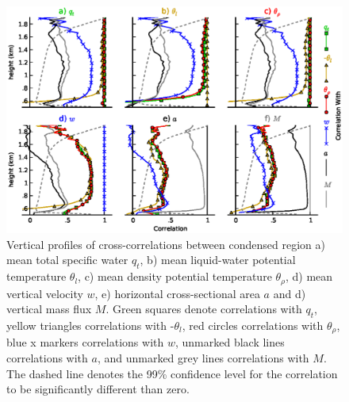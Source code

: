 \documentclass[acp]{copernicus}
\begin{document}
\begin{figure}[t]
\vspace*{2mm}
\begin{center}
\includegraphics[width=\textwidth]{./figures/cloud_autocorrelation}
\end{center}
\caption{Vertical profiles of cross-correlations between condensed region 
a) mean total specific water $q_t$, b) mean liquid-water potential 
temperature $\theta_l$, c) mean density potential temperature $\theta_\rho$, 
d) mean vertical velocity $w$, e) horizontal cross-sectional area $a$ and 
d) vertical mass flux $M$.  Green squares denote correlations with $q_t$, 
yellow triangles correlations with -$\theta_l$, red circles correlations with 
$\theta_\rho$, blue x markers correlations with $w$, unmarked black lines 
correlations with $a$, and unmarked grey lines correlations with $M$. The 
dashed line denotes the 99\% confidence level for the correlation to be 
significantly different than zero.}
\label{fig:cloud_autocorrelation}
\end{figure}
\end{document}
